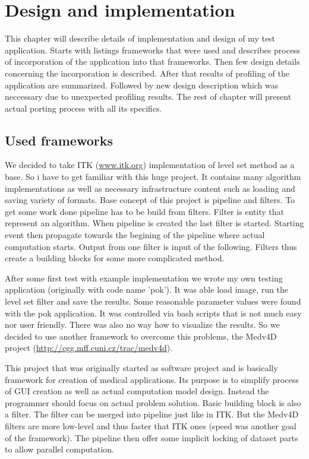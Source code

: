 \chapter{Design and implementation}

This chapter will describe details of implementation and design of my test application.
Starts with listings frameworks that were used and describes process of incorporation of the application into that frameworks.
Then few design details concerning the incorporation is described.
After that results of profiling of the application are summarized.
Followed by new design description which was neccessary due to unexpected profiling results.
The rest of chapter will present actual porting process with all its specifics.

\section{Used frameworks}

\par
We decided to take ITK (\url{www.itk.org}) implementation of level set method as a base.
So i have to get familiar with this huge project.
It contains many algorithm implementations as well as necessary infrastructure content such as loading and saving variety of formats.
Base concept of this project is pipeline and filters.
To get some work done pipeline has to be build from filters.
Filter is entity that represent an algorithm.
When pipeline is created the last filter is started.
Starting event then propagate towards the begining of the pipeline where actual computation starts.
Output from one filter is input of the following.
Filters thus create a building blocks for some more complicated method.

\par
After some first test with example implementation we wrote my own testing application (originally with code name 'pok').
It was able load image, run the level set filter and save the results.
Some reasonable parameter values were found with the pok application.
It was controlled via bash scripts that is not much easy nor user friendly.
There was also no way how to visualize the results.
So we decided to use another framework to overcome this problems, the Medv4D project (\url{http://cgg.mff.cuni.cz/trac/medv4d}).

\par
This project that was originally started as software project and is basically framework for creation of medical applications.
Its purpose is to simplify process of GUI creation as well as actual computation model design.
Instead the programmer should focus on actual problem solution.
Basic building block is also a filter.
The filter can be merged into pipeline just like in ITK.
But the Medv4D filters are more low-level and thus faster that ITK ones (speed was another goal of the framework).
The pipeline then offer some implicit locking of dataset parts to allow parallel computation.

